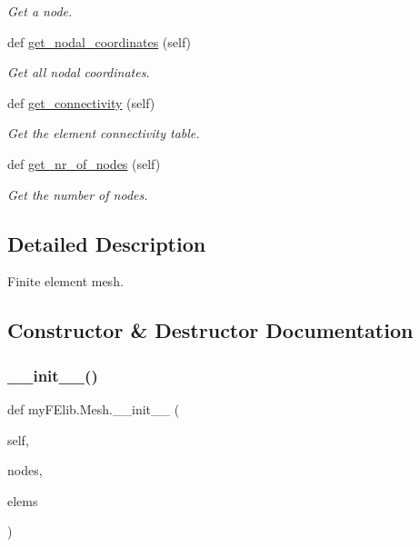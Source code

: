 \begin{DoxyCompactItemize}
\begin{DoxyCompactList}\small\item\em Get a node. \end{DoxyCompactList}\item 
def \mbox{\hyperlink{classmyFElib_1_1Mesh_ae099773e290dd0b1476558bbf6f2272a}{get\+\_\+nodal\+\_\+coordinates}} (self)
\begin{DoxyCompactList}\small\item\em Get all nodal coordinates. \end{DoxyCompactList}\item 
def \mbox{\hyperlink{classmyFElib_1_1Mesh_ac4e674a719553db6c87ef5ef354fcec2}{get\+\_\+connectivity}} (self)
\begin{DoxyCompactList}\small\item\em Get the element connectivity table. \end{DoxyCompactList}\item 
\mbox{\label{classmyFElib_1_1Mesh_a0de5a4081abdfc70acf9dd1003d39db5}} 
def \mbox{\hyperlink{classmyFElib_1_1Mesh_a0de5a4081abdfc70acf9dd1003d39db5}{get\+\_\+nr\+\_\+of\+\_\+nodes}} (self)
\begin{DoxyCompactList}\small\item\em Get the number of nodes. \end{DoxyCompactList}\end{DoxyCompactItemize}


\subsection{Detailed Description}
Finite element mesh. 

\subsection{Constructor \& Destructor Documentation}
\mbox{\label{classmyFElib_1_1Mesh_a0fc9ee65d24f94c8f93a65ed9b478403}} 
\subsubsection{\texorpdfstring{\+\_\+\+\_\+init\+\_\+\+\_\+()}{\_\_init\_\_()}}
{\footnotesize\ttfamily def my\+F\+Elib.\+Mesh.\+\_\+\+\_\+init\+\_\+\+\_\+ (\begin{DoxyParamCaption}\item[{}]{self,  }\item[{}]{nodes,  }\item[{}]{elems }\end{DoxyParamCaption})}



